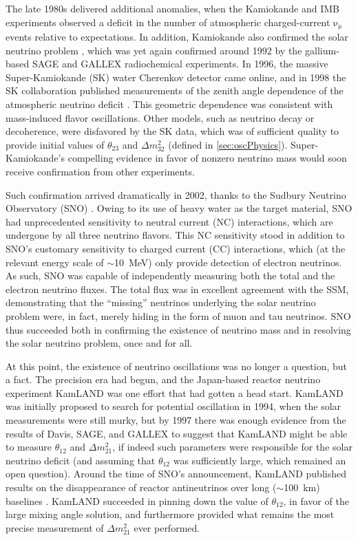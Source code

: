 \documentclass[../thesis.tex]{subfiles}
\begin{document}
The late 1980s delivered additional anomalies, when the Kamiokande \cite{HIRATA1988416} and IMB \cite{PhysRevLett.66.2561} experiments observed a deficit in the number of atmospheric charged-current \(\mathrm{\nu_\mu}\) events relative to expectations. In addition, Kamiokande also confirmed the solar neutrino problem \cite{SUZUKI199554}, which was yet again confirmed around 1992 by the gallium-based SAGE \cite{GAVRIN200136} and GALLEX \cite{VIGNAUD199820} radiochemical experiments. In 1996, the massive Super-Kamiokande (SK) water Cherenkov detector came online, and in 1998 the SK collaboration published measurements of the zenith angle dependence of the atmospheric neutrino deficit \cite{PhysRevLett.81.1562}. This geometric dependence was consistent with mass-induced flavor oscillations. Other models, such as neutrino decay or decoherence, were disfavored by the SK data, which was of sufficient quality to provide initial values of \(\theta_{23}\) and \(\Delta m^2_{32}\) (defined in \autoref{sec:oscPhysics}). Super-Kamiokande's compelling evidence in favor of nonzero neutrino mass would soon receive confirmation from other experiments.

Such confirmation arrived dramatically in 2002, thanks to the Sudbury Neutrino Observatory (SNO) \cite{PhysRevLett.89.011301}. Owing to its use of heavy water as the target material, SNO had unprecedented sensitivity to neutral current (NC) interactions, which are undergone by all three neutrino flavors. This NC sensitivity stood in addition to SNO's customary sensitivity to charged current (CC) interactions, which (at the relevant energy scale of $\sim$10~MeV) only provide detection of electron neutrinos. As such, SNO was capable of independently measuring both the total and the electron neutrino fluxes. The total flux was in excellent agreement with the SSM, demonstrating that the ``missing'' neutrinos underlying the solar neutrino problem were, in fact, merely hiding in the form of muon and tau neutrinos. SNO thus succeeded both in confirming the existence of neutrino mass and in resolving the solar neutrino problem, once and for all.

At this point, the existence of neutrino oscillations was no longer a question, but a fact. The precision era had begun, and the Japan-based reactor neutrino experiment KamLAND was one effort that had gotten a head start. KamLAND was initially proposed to search for potential oscillation in 1994, when the solar measurements were still murky, but by 1997 there was enough evidence from the results of Davis, SAGE, and GALLEX to suggest that KamLAND might be able to measure $\theta_{12}$ and $\Delta m^2_{21}$, if indeed such parameters were responsible for the solar neutrino deficit (and assuming that $\theta_{12}$ was sufficiently large, which remained an open question). Around the time of SNO's announcement, KamLAND published results on the disappearance of reactor antineutrinos over long ($\sim$100~km) baselines \cite{PhysRevLett.90.021802}. KamLAND succeeded in pinning down the value of $\theta_{12}$, in favor of the large mixing angle solution, and furthermore provided what remains the most precise measurement of \(\Delta m^2_{21}\) ever performed.
\end{document}

